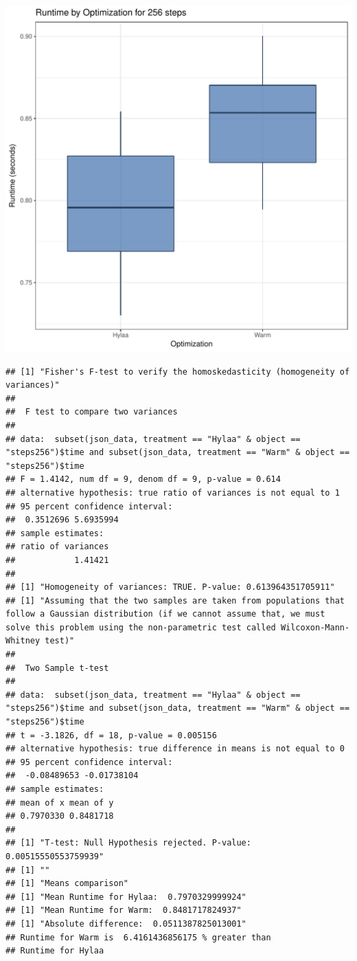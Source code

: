 \documentclass{article}\usepackage[]{graphicx}\usepackage[]{color}
\makeatletter
\def\maxwidth{ %
  \ifdim\Gin@nat@width>\linewidth
    \linewidth
  \else
    \Gin@nat@width
  \fi
}
\newenvironment{kframe}{%
 \def\at@end@of@kframe{}%
 \ifinner\ifhmode%
  \def\at@end@of@kframe{\end{minipage}}%
  \begin{minipage}{\columnwidth}%
 \fi\fi%
 \def\FrameCommand##1{\hskip\@totalleftmargin \hskip-\fboxsep
 \colorbox{shadecolor}{##1}\hskip-\fboxsep
     \hskip-\linewidth \hskip-\@totalleftmargin \hskip\columnwidth}%
 \MakeFramed {\advance\hsize-\width
   \@totalleftmargin\z@ \linewidth\hsize
   \@setminipage}}%
 {\par\unskip\endMakeFramed%
 \at@end@of@kframe}
\newenvironment{knitrout}{}{} %
\makeatother
\begin{document}
\begin{knitrout}
\color{fgcolor}
\includegraphics[width=\maxwidth]{figure/RH1_steps256-1} 
\begin{kframe}\begin{verbatim}
## [1] "Fisher's F-test to verify the homoskedasticity (homogeneity of variances)"
## 
## 	F test to compare two variances
## 
## data:  subset(json_data, treatment == "Hylaa" & object == "steps256")$time and subset(json_data, treatment == "Warm" & object == "steps256")$time
## F = 1.4142, num df = 9, denom df = 9, p-value = 0.614
## alternative hypothesis: true ratio of variances is not equal to 1
## 95 percent confidence interval:
##  0.3512696 5.6935994
## sample estimates:
## ratio of variances 
##            1.41421 
## 
## [1] "Homogeneity of variances: TRUE. P-value: 0.613964351705911"
## [1] "Assuming that the two samples are taken from populations that follow a Gaussian distribution (if we cannot assume that, we must solve this problem using the non-parametric test called Wilcoxon-Mann-Whitney test)"
## 
## 	Two Sample t-test
## 
## data:  subset(json_data, treatment == "Hylaa" & object == "steps256")$time and subset(json_data, treatment == "Warm" & object == "steps256")$time
## t = -3.1826, df = 18, p-value = 0.005156
## alternative hypothesis: true difference in means is not equal to 0
## 95 percent confidence interval:
##  -0.08489653 -0.01738104
## sample estimates:
## mean of x mean of y 
## 0.7970330 0.8481718 
## 
## [1] "T-test: Null Hypothesis rejected. P-value: 0.00515550553759939"
## [1] ""
## [1] "Means comparison"
## [1] "Mean Runtime for Hylaa:  0.7970329999924"
## [1] "Mean Runtime for Warm:  0.8481717824937"
## [1] "Absolute difference:  0.0511387825013001"
## Runtime for Warm is  6.4161436856175 % greater than 
## Runtime for Hylaa
\end{verbatim}
\end{kframe}
\end{knitrout}
\end{document}
